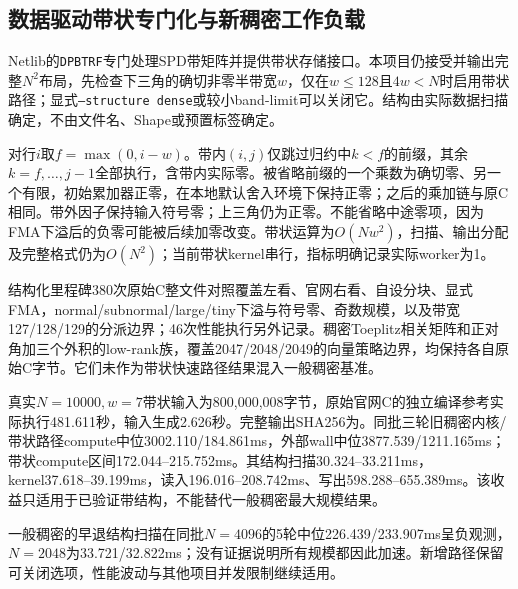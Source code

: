 \documentclass[UTF8,a4paper,11pt]{ctexart}
\begin{document}
\subsection{数据驱动带状专门化与新稠密工作负载}
Netlib的\texttt{DPBTRF}专门处理SPD带矩阵并提供带状存储接口\cite{lapackband}。本项目仍接受并输出完整$N^2$布局，先检查下三角的确切非零半带宽$w$，仅在$w\leq128$且$4w<N$时启用带状路径；显式\texttt{--structure dense}或较小band-limit可以关闭它。结构由实际数据扫描确定，不由文件名、Shape或预置标签确定。

对行$i$取$f=\max(0,i-w)$。带内$(i,j)$仅跳过归约中$k<f$的前缀，其余$k=f,\ldots,j-1$全部执行，含带内实际零。被省略前缀的一个乘数为确切零、另一个有限，初始累加器正零，在本地默认舍入环境下保持正零；之后的乘加链与原C相同。带外因子保持输入符号零；上三角仍为正零。不能省略中途零项，因为FMA下溢后的负零可能被后续加零改变。带状运算为$O(Nw^2)$，扫描、输出分配及完整格式仍为$O(N^2)$；当前带状kernel串行，指标明确记录实际worker为1。

结构化里程碑380次原始C整文件对照覆盖左看、官网右看、自设分块、显式FMA，normal/subnormal/large/tiny下溢与符号零、奇数规模，以及带宽127/128/129的分派边界；46次性能执行另外记录。稠密Toeplitz相关矩阵和正对角加三个外积的low-rank族，覆盖2047/2048/2049的向量策略边界，均保持各自原始C字节。它们未作为带状快速路径结果混入一般稠密基准。

真实$N=10000,w=7$带状输入为800,000,008字节，原始官网C的独立编译参考实际执行481.611秒，输入生成2.626秒。完整输出SHA256为。同批三轮旧稠密内核/带状路径compute中位3002.110/184.861ms，外部wall中位3877.539/1211.165ms；带状compute区间172.044--215.752ms。其结构扫描30.324--33.211ms，kernel37.618--39.199ms，读入196.016--208.742ms、写出598.288--655.389ms。该收益只适用于已验证带结构，不能替代一般稠密最大规模结果。

一般稠密的早退结构扫描在同批$N=4096$的5轮中位226.439/233.907ms呈负观测，$N=2048$为33.721/32.822ms；没有证据说明所有规模都因此加速。新增路径保留可关闭选项，性能波动与其他项目并发限制继续适用。
\end{document}
